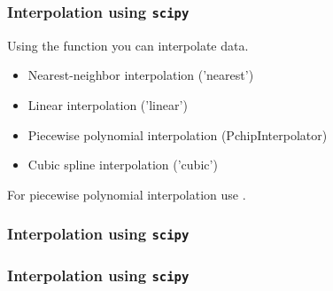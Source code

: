 \documentclass{beamer}
\begin{document}
\begin{frame}
  \frametitle{Interpolation using \texttt{scipy}}
  Using the \texttt{} function you can interpolate data.\\
  \begin{itemize}
    \item Nearest-neighbor interpolation ('nearest')
    \item Linear interpolation ('linear')
    \item Piecewise polynomial interpolation (PchipInterpolator)
    \item Cubic spline interpolation ('cubic')
  \end{itemize}
  For piecewise polynomial interpolation use \texttt{}.\\
\end{frame}
\begin{frame}
  \frametitle{Interpolation using \texttt{scipy}}
  
\end{frame}
\begin{frame}
  \frametitle{Interpolation using \texttt{scipy}}
  
\end{frame}
\end{document}
